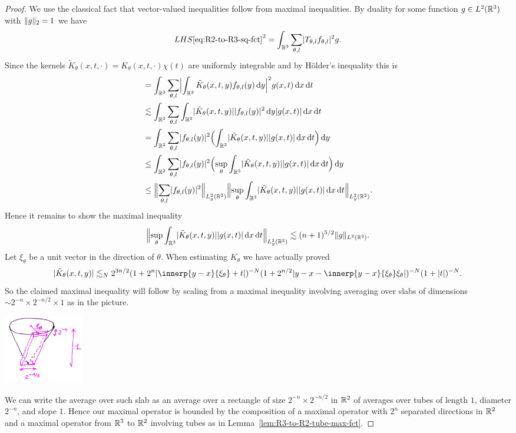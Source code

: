 \begin{proof}
We use the classical fact that vector-valued inequalities follow from maximal inequalities.
By duality for some function $g \in L^{2}(\R^{3})$ with $\norm{g}_{2}=1$ we have
\[
LHS\eqref{eq:R2-to-R3-sq-fct}^{2}
=
\int_{\R^{3}} \sum_{\theta,l} \abs{T_{\theta,l}f_{\theta,l}}^{2} g.
\]
Since the kernels $\tilde{K}_{\theta}(x,t,\cdot) = K_{\theta}(x,t,\cdot) \chi(t)$ are uniformly integrable and by H\"older's inequality this is
\begin{align*}
&=
\int_{\R^{3}} \sum_{\theta,l} \abs[\Big]{\int_{\R^{2}} \tilde{K}_{\theta}(x,t,y) f_{\theta,l}(y) \dif y}^{2} g(x,t) \dif x \dif t\\
&\lesssim
\int_{\R^{3}} \sum_{\theta,l} \int_{\R^{2}} \abs{\tilde{K}_{\theta}(x,t,y)} \abs{f_{\theta,l}(y)}^{2} \dif y \abs{g(x,t)} \dif x \dif t\\
&=
\int_{\R^{2}} \sum_{\theta,l}  \abs{f_{\theta,l}(y)}^{2} \Bigl( \int_{\R^{3}} \abs{\tilde{K}_{\theta}(x,t,y)} \abs{g(x,t)} \dif x \dif t \Bigr) \dif y\\
&\leq
\int_{\R^{2}} \sum_{\theta,l}  \abs{f_{\theta,l}(y)}^{2} \Bigl( \sup_{\theta} \int_{\R^{3}} \abs{\tilde{K}_{\theta}(x,t,y)} \abs{g(x,t)} \dif x \dif t \Bigr) \dif y\\
&\leq
\norm[\Big]{ \sum_{\theta,l}  \abs{f_{\theta,l}(y)}^{2} }_{L^{2}_{y}(\R^{2})}
\norm[\Big]{ \sup_{\theta} \int_{\R^{3}} \abs{\tilde{K}_{\theta}(x,t,y)} \abs{g(x,t)} \dif x \dif t }_{L^{2}_{y}(\R^{2})}.
\end{align*}
Hence it remains to show the maximal inequality
\[
\norm[\Big]{ \sup_{\theta} \int_{\R^{3}} \abs{\tilde{K}_{\theta}(x,t,y)} \abs{g(x,t)} \dif x \dif t }_{L^{2}_{y}(\R^{2})}
\lesssim
(n+1)^{5/2} \norm{g}_{L^{2}(\R^{3})}.
\]
Let $\xi_{\theta}$ be a unit vector in the direction of $\theta$.
When estimating $K_{\theta}$ we have actually proved
\[
\abs{\tilde{K}_{\theta}(x,t,y)}
\lesssim_{N}
2^{3n/2} (1+2^{n} \abs{\innerp{y-x}{\xi_{\theta}}+t})^{-N} (1+2^{n/2} \abs{y-x- \innerp{y-x}{\xi_{\theta}} \xi_{\theta}})^{-N} (1+\abs{t})^{-N}.
\]
So the claimed maximal inequality will follow by scaling from a maximal inequality involving averaging over slabs of dimensions $\sim 2^{-n} \times 2^{-n/2} \times 1$ as in the picture.
\begin{center}
\includegraphics[height=3cm]{cone-max-fct.png}
\end{center}
We can write the average over such slab as an average over a rectangle of size $2^{-n} \times 2^{-n/2}$ in $\R^{2}$ of averages over tubes of length $1$, diameter $2^{-n}$, and slope $1$.
Hence our maximal operator is bounded by the composition of a maximal operator with $2^{n}$ separated directions in $\R^{2}$ and a maximal operator from $\R^{3}$ to $\R^{2}$ involving tubes as in Lemma~\ref{lem:R3-to-R2-tube-max-fct}.
\end{proof}
